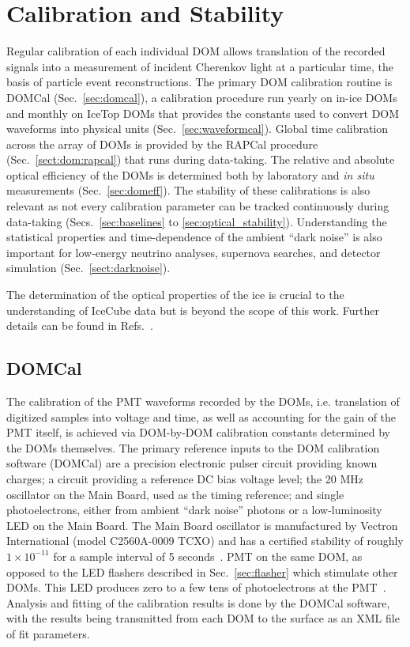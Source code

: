 \section{\label{sec:dom_calibration}Calibration and Stability}

Regular calibration of each individual DOM allows translation of the
recorded signals into a measurement of incident Cherenkov light at a
particular time, the basis of particle event reconstructions.  The
primary DOM calibration routine is DOMCal (Sec.~\ref{sec:domcal}), a
calibration procedure run yearly on in-ice DOMs and monthly on IceTop
DOMs that provides the constants used to convert DOM waveforms into
physical units (Sec.~\ref{sec:waveformcal}).  Global time calibration across the array of DOMs is 
provided by the RAPCal procedure (Sec.~\ref{sect:dom:rapcal}) that runs during
data-taking.  The relative and absolute optical efficiency of the DOMs is
determined both by laboratory and \emph{in situ} measurements
(Sec.~\ref{sec:domeff}). The stability of these calibrations is also relevant
as not every calibration parameter can be tracked continuously during
data-taking (Secs.~\ref{sec:baselines} to \ref{sec:optical_stability}).
Understanding the statistical properties and time-dependence of the ambient ``dark
noise'' is also important for low-energy neutrino analyses, supernova
searches, and detector simulation (Sec.~\ref{sect:darknoise}).

The determination of the optical properties of the ice is crucial to
the understanding of IceCube data but is beyond the scope of this work.
Further details can be found in Refs.~\cite{Aartsen:2013rt,IC3:spice_lea}.

\subsection{\label{sec:domcal}DOMCal}

The calibration of the PMT waveforms recorded by the DOMs, i.e. translation
of digitized samples into voltage and time, as well as accounting for the
gain of the PMT itself, is achieved via DOM-by-DOM calibration constants
determined by the DOMs themselves. The primary reference inputs to
the DOM calibration software (DOMCal) are a precision electronic
pulser circuit providing known charges; a circuit providing a reference DC
bias voltage level; the 20 MHz oscillator on the Main
Board, used as the timing reference; and single photoelectrons, either from
ambient ``dark noise'' photons or a low-luminosity LED on the Main
Board. The Main Board oscillator is manufactured by Vectron
International (model C2560A-0009 TCXO) and has a certified stability
of roughly $1 \times 10^{-11}$ for a sample interval of 5 seconds~\cite{ICECUBE:DAQ}.
PMT on the same DOM, as opposed to the LED flashers described in
Sec.~\ref{sec:flasher} which stimulate other DOMs. This LED produces
zero to a few tens of photoelectrons at the PMT~\cite{ICECUBE:DAQ}. Analysis and fitting of the
calibration results is done by the DOMCal software, with the results being
transmitted from each DOM to the surface as an XML file of fit parameters.

